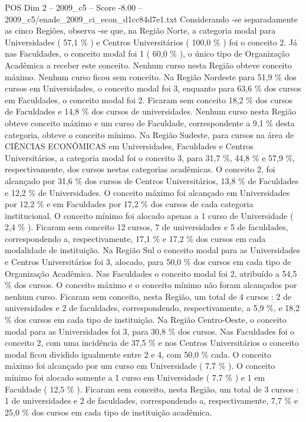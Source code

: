 \begin{textsample}{POS Dim 2 – 2009\_c5 – Score -8.00 – 2009\_c5/enade\_2009\_ci\_econ\_d1cc84d7e1.txt}
Considerando -se separadamente as cinco Regiões, observa -se que, na Região Norte, a categoria modal para Universidades ( 57,1 \% ) e Centros Universitários ( 100,0 \% ) foi o conceito 2.
Já nas Faculdades, o conceito modal foi 1 ( 60,0 \% ), o único tipo de Organização Acadêmica a receber este conceito.
Nenhum curso nesta Região obteve conceito máximo.
Nenhum curso ficou sem conceito.
Na Região Nordeste para 51,9 \% dos cursos em Universidades, o conceito modal foi 3, enquanto para 63,6 \% dos cursos em Faculdades, o conceito modal foi 2.
Ficaram sem conceito 18,2 \% dos cursos de Faculdades e 14,8 \% dos cursos de universidades.
Nenhum curso nesta Região obteve conceito máximo e um curso de Faculdade, correspondente a 9,1 \% desta categoria, obteve o conceito mínimo.
Na Região Sudeste, para cursos na área de CIÊNCIAS ECONÔMICAS em Universidades, Faculdades e Centros Universitários, a categoria modal foi o conceito 3, para 31,7 \%, 44,8 \% e 57,9 \%, respectivamente, dos cursos nestas categorias acadêmicas.
O conceito 2, foi alcançado por 31,6 \% dos cursos de Centros Universitários, 13,8 \% de Faculdades e 12,2 \% de Universidades.
O conceito máximo foi alcançado em Universidades por 12,2 \% e em Faculdades por 17,2 \% dos cursos de cada categoria institucional.
O conceito mínimo foi alocado apenas a 1 curso de Universidade ( 2,4 \% ).
Ficaram sem conceito 12 cursos, 7 de universidades e 5 de faculdades, correspondendo a, respectivamente, 17,1 \% e 17,2 \% dos cursos em cada modalidade de instituição.
Na Região Sul o conceito modal para as Universidades e Centros Universitários foi 3, alocado, para 50,0 \% dos cursos em cada tipo de Organização Acadêmica.
Nas Faculdades o conceito modal foi 2, atribuído a 54,5 \% dos cursos.
O conceito máximo e o conceito mínimo não foram alcançados por nenhum curso.
Ficaram sem conceito, nesta Região, um total de 4 cursos : 2 de universidades e 2 de faculdades, correspondendo, respectivamente, a 5,9 \%, e 18,2 \% dos cursos em cada tipo de instituição.
Na Região Centro-Oeste, o conceito modal para as Universidades foi 3, para 30,8 \% dos cursos.
Nas Faculdades foi o conceito 2, com uma incidência de 37,5 \% e nos Centros Universitários o conceito modal ficou dividido igualmente entre 2 e 4, com 50,0 \% cada.
O conceito máximo foi alcançado por um curso em Universidade ( 7,7 \% ).
O conceito mínimo foi alocado somente a 1 curso em Universidade ( 7,7 \% ) e 1 em Faculdade ( 12,5 \% ).
Ficaram sem conceito, nesta Região, um total de 3 cursos : 1 de universidades e 2 de faculdades, correspondendo a, respectivamente, 7,7 \% e 25,0 \% dos cursos em cada tipo de instituição acadêmica.

\end{textsample}
